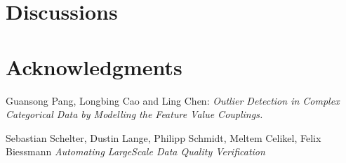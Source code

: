\documentclass{article}
\begin{document}

\section{Discussions} %
\label{sec:Discussions}




\section*{Acknowledgments} %
\label{sec:Acknowledgments}




\begin{thebibliography}{999}

    Guansong Pang, Longbing Cao and Ling Chen:
    \emph{Outlier Detection in Complex Categorical Data
        by Modelling the Feature Value Couplings.}

    Sebastian Schelter, Dustin Lange, Philipp Schmidt, Meltem Celikel, Felix Biessmann
    \emph{Automating LargeScale Data Quality Verification}


\end{thebibliography}
\end{document}
